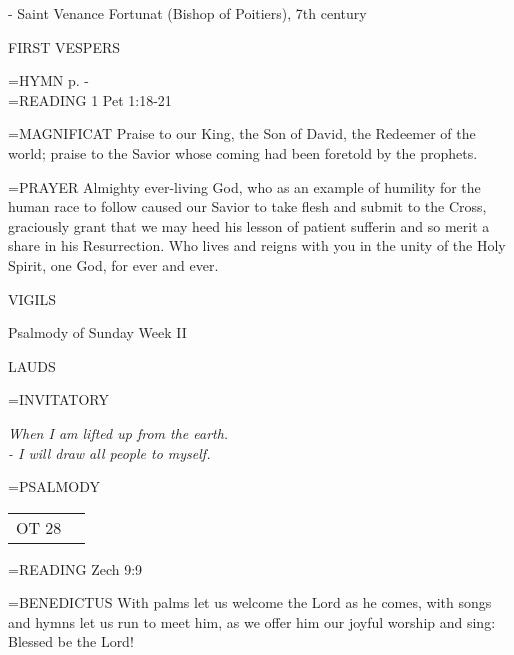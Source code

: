 - Saint Venance Fortunat (Bishop of Poitiers), 7th century

\begin{flushleft}\normalsize FIRST VESPERS\\\end{flushleft}
\hangindent=\parindent \small{\uppercase{HYMN} p. \pageref{lent:firstHymn}-\pageref{lent:lastHymn}\\}
\hangindent=\parindent \small{\uppercase{READING}}    1 Pet 1:18-21 \textbf{   \\}

\hangindent=\parindent \small{MAGNIFICAT 	Praise to our King, the Son of David, the Redeemer of the world; praise to the Savior whose coming had been foretold by the prophets.\\}

\hangindent=\parindent \small{PRAYER 	Almighty ever-living God, who as an example of humility for the human race to follow caused our Savior to take flesh and submit to the Cross, graciously grant that we may heed his lesson of patient sufferin and so merit a share in his Resurrection. Who lives and reigns with you in the unity of the Holy Spirit, one God, for ever and ever.}

\begin{flushleft}\normalsize VIGILS\\\end{flushleft}
Psalmody of Sunday Week II

\begin{flushleft}\normalsize LAUDS\\\end{flushleft}
\hangindent=\parindent \small{INVITATORY}
\begin{center}
\textit{When I am lifted up from the earth.\\}
\textit{- I will draw all people to myself.\\}
\end{center}

\hangindent=\parindent \small{PSALMODY}
\begin{center}
\begin{tabular}{ l l }
OT 28 & \\
\end{tabular}
\end{center}		

\hangindent=\parindent \small{\uppercase{READING}}    Zech 9:9 \textbf{   \\}

\hangindent=\parindent \small{BENEDICTUS 	With palms let us welcome the Lord as he comes, with songs and hymns let us run to meet him, as we offer him our joyful worship and sing: Blessed be the Lord!\\}


